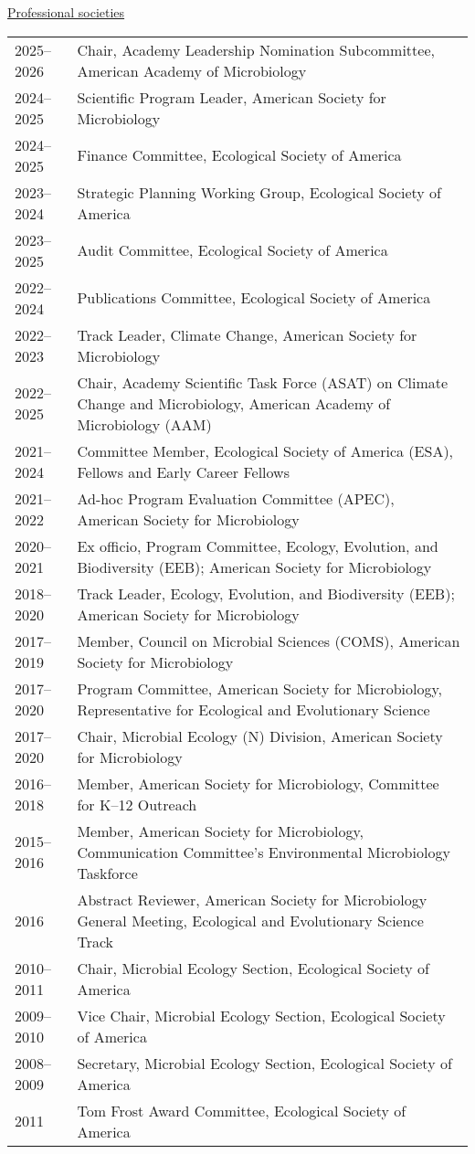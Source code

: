 \documentclass[11pt]{article}
\begin{document}
\vspace{-0.5em}
\textnormal{\underline{Professional societies}} \\[-2.5em]
\begin{longtable}{@{}p{4em}@{\hspace{2em}}p{}@{}}
2025--2026 & Chair, Academy Leadership Nomination Subcommittee, American Academy of Microbiology \\
2024--2025 & Scientific Program Leader, American Society for Microbiology \\
2024--2025 & Finance Committee, Ecological Society of America \\
2023--2024 & Strategic Planning Working Group, Ecological Society of America \\
2023--2025 & Audit Committee, Ecological Society of America \\
2022--2024 & Publications Committee, Ecological Society of America \\
2022--2023 & Track Leader, Climate Change, American Society for Microbiology \\
2022--2025 & Chair, Academy Scientific Task Force (ASAT) on Climate Change and Microbiology, American Academy of Microbiology (AAM) \\
2021--2024 & Committee Member, Ecological Society of America (ESA), Fellows and Early Career Fellows \\
2021--2022 & Ad-hoc Program Evaluation Committee (APEC), American Society for Microbiology \\
2020--2021 & Ex officio, Program Committee, Ecology, Evolution, and Biodiversity (EEB); American Society for Microbiology \\
2018--2020 & Track Leader, Ecology, Evolution, and Biodiversity (EEB); American Society for Microbiology \\
2017--2019 & Member, Council on Microbial Sciences (COMS), American Society for Microbiology \\
2017--2020 & Program Committee, American Society for Microbiology, Representative for Ecological and Evolutionary Science \\
2017--2020 & Chair, Microbial Ecology (N) Division, American Society for Microbiology \\
2016--2018 & Member, American Society for Microbiology, Committee for K--12 Outreach \\
2015--2016 & Member, American Society for Microbiology, Communication Committee’s Environmental Microbiology Taskforce \\
2016 & Abstract Reviewer, American Society for Microbiology General Meeting, Ecological and Evolutionary Science Track \\
2010--2011 & Chair, Microbial Ecology Section, Ecological Society of America \\
2009--2010 & Vice Chair, Microbial Ecology Section, Ecological Society of America \\
2008--2009 & Secretary, Microbial Ecology Section, Ecological Society of America \\
2011 & Tom Frost Award Committee, Ecological Society of America \\
\end{longtable}
\end{document}
